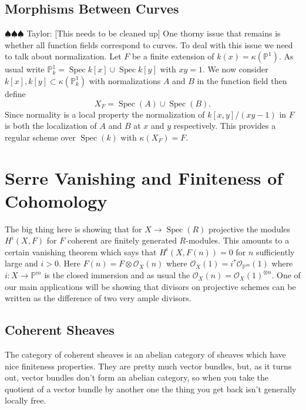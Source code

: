 \documentclass[12pt]{article}
\numberwithin{equation}{section}
\theoremstyle{definition}
\theoremstyle{remark}
\newcommand{\Ocal}{\mathcal{O}}
\newcommand{\PP}{\mathbb{P}}
\newcommand{\Spec}{\operatorname{Spec}}
\newcommand{\taylor}[1]{{\color{blue} \sf $\spadesuit\spadesuit\spadesuit$ Taylor: [#1]}}
\begin{document}
\subsection{Morphisms Between Curves}
\taylor{This needs to be cleaned up}
One thorny issue that remains is whether all function fields correspond to curves. 
To deal with this issue we need to talk about normalization. 
Let $F$ be a finite extension of $k(x) =\kappa(\PP^1)$.
As usual write $\PP^1_k = \Spec k[x] \cup \Spec k[y]$ with $xy=1$. 
We now consider $k[x], k[y] \subset \kappa(\PP^1_k)$ with normalizations $A$ and $B$ in the function field then define 
$$ X_F = \Spec(A) \cup \Spec(B). $$
Since normality is a local property the normalization of $k[x,y]/(xy-1)$ in $F$ is both the localization of $A$ and $B$ at $x$ and $y$ respectively. 
This provides a regular scheme over $\Spec(k)$ with $\kappa(X_F)=F$.
 

\section{Serre Vanishing and Finiteness of Cohomology}

The big thing here is showing that for $X\to \Spec(R)$ projective the modules $H^i(X,F)$ for $F$ coherent are finitely generated $R$-modules. 
This amounts to a certain vanishing theorem which says that $H^i(X,F(n))=0$ for $n$ sufficiently large and $i>0$.
Here $F(n) = F\otimes \Ocal_X(n)$ where $\Ocal_X(1) = i^* \Ocal_{\PP^m}(1)$ where $i:X \to \PP^m$ is the closed immersion and as usual the $\Ocal_X(n) = \Ocal_X(1)^{\otimes n}$.
One of our main applications will be showing that divisors on projective schemes can be written as the difference of two very ample divisors.

\subsection{Coherent Sheaves}
The category of coherent sheaves is an abelian category of sheaves which have nice finiteness properties. 
They are pretty much vector bundles, but, as it turns out, vector bundles don't form an abelian category, so when you take the quotient of a vector bundle by another one the thing you get back isn't generally locally free. 
\end{document}
